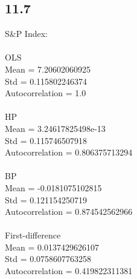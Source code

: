 \documentclass[letterpaper,12pt]{article}
\theoremstyle{definition}
\begin{document}
\subsection*{11.7}
S\&P Index:\\
\\
OLS\\
Mean = 7.20602060925\\
Std = 0.115802246374\\
Autocorrelation = 1.0\\
\\
HP\\
Mean = 3.24617825498e-13\\
Std = 0.115746507918\\
Autocorrelation = 0.806375713294\\
\\
BP\\
Mean = -0.0181075102815\\
Std = 0.121154250719\\
Autocorrelation = 0.874542562966\\
\\
First-difference\\
Mean = 0.0137429626107\\
Std = 0.0758607763258\\
Autocorrelation = 0.419822311381\\
\end{document}
